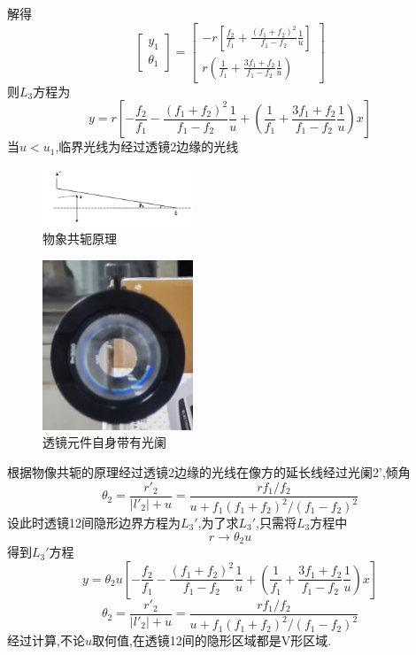 \documentclass[UTF8]{gapd}
\begin{document}
解得
\begin{equation}
  \begin{bmatrix}
      y_1\\
      \theta_1
  \end{bmatrix}=\begin{bmatrix}
      -r[\frac{f_2}{f_1}+\frac{(f_1+f_2)^2}{f_1-f_2}\frac{1}{u}   ]\\
      r(\frac{1}{f_1}+ \frac{3f_1+f_2}{f_1-f_2}\frac{1}{u}  )
  \end{bmatrix}
\end{equation}
则$L_3$方程为
\begin{equation}
  y=r[-\frac{f_2}{f_1}-\frac{(f_1+f_2)^2}{f_1-f_2}\frac{1}{u}  + (\frac{1}{f_1}+ \frac{3f_1+f_2}{f_1-f_2}\frac{1}{u}  )x]
\end{equation}
当$u<u_1$,临界光线为经过透镜2边缘的光线
\begin{figure}
  \centering
  \includegraphics[width=0.4\textwidth]{images/9.jpg}
  \caption{物象共轭原理}
  \label{fig:9}
\end{figure}
\begin{figure}
  \centering
  \includegraphics[width=0.4\textwidth]{images/10.jpg}
  \caption{透镜元件自身带有光阑}
  \label{fig:10}
\end{figure}
根据物像共轭的原理经过透镜2边缘的光线在像方的延长线经过光阑2',倾角
\begin{equation}
  \theta_2=\frac{r'_2}{|l'_2|+u} =\frac{rf_1/f_2}{u+f_1(f_1+f_2)^2/(f_1-f_2)^2} 
\end{equation}
设此时透镜12间隐形边界方程为$L_3'$,为了求$L_3'$,只需将$L_3$方程中
\begin{equation}
  r\rightarrow \theta_2 u
\end{equation}
得到$L_3'$方程
\begin{equation}
  y=\theta_2u[-\frac{f_2}{f_1}-\frac{(f_1+f_2)^2}{f_1-f_2}\frac{1}{u}  + (\frac{1}{f_1}+ \frac{3f_1+f_2}{f_1-f_2}\frac{1}{u}  )x]
\end{equation}
\begin{equation}
  \theta_2=\frac{r'_2}{|l'_2|+u} =\frac{rf_1/f_2}{u+f_1(f_1+f_2)^2/(f_1-f_2)^2} 
\end{equation}
经过计算,不论$u$取何值,在透镜12间的隐形区域都是V形区域.
\end{document}
